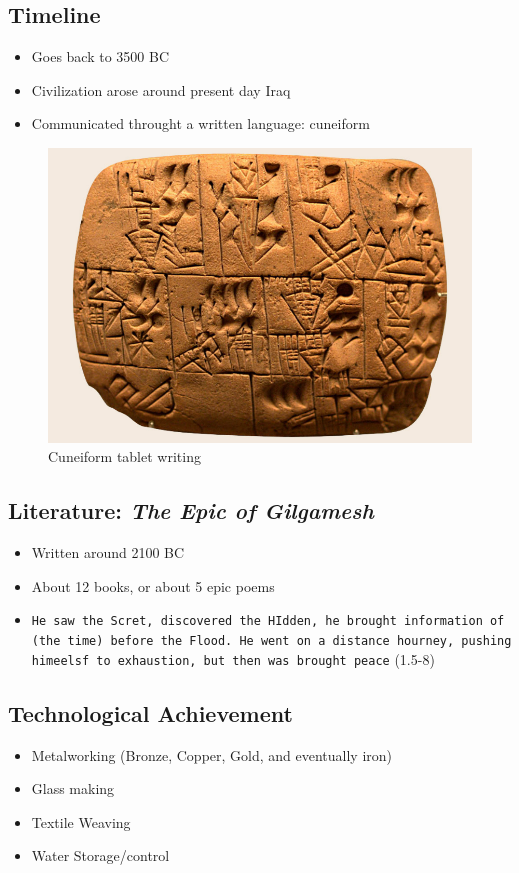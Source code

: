 \documentclass[11pt]{article}
\begin{document}
\subsection{Timeline}
\label{sec-3-6}
\begin{itemize}
\item Goes back to 3500 BC

\item Civilization arose around present day Iraq

\item Communicated throught a written language: cuneiform
\end{itemize}
\begin{figure}[htb]
\centering
\includegraphics[width=.9\linewidth]{./img/CuneiformTablet.png}
\caption{Cuneiform tablet writing}
\end{figure}

\subsection{Literature: \emph{The Epic of Gilgamesh}}
\label{sec-3-7}
\begin{itemize}
\item Written around 2100 BC

\item About 12 books, or about 5 epic poems

\item \texttt{He saw the Scret, discovered the HIdden, he brought information of (the time) before the Flood. He went on a distance hourney, pushing himeelsf to exhaustion, but then was brought peace} (1.5-8)
\end{itemize}

\subsection{Technological Achievement}
\label{sec-3-8}
\begin{itemize}
\item Metalworking (Bronze, Copper, Gold, and eventually iron)

\item Glass making

\item Textile Weaving

\item Water Storage/control
\end{itemize}
\end{document}
